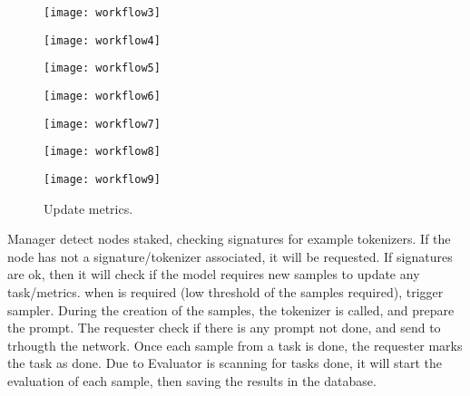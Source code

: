 \begin{figure}[H]
    \centering        
    \texttt{[image: workflow3]}
    \caption{}
    \label{secb:fig:wf3}
\end{figure}

\begin{figure}[H]
    \centering        
    \texttt{[image: workflow4]}
    \caption{}
    \label{secb:fig:wf4}
\end{figure}

\begin{figure}[H]
    \centering
    \texttt{[image: workflow5]}
    \caption{}
    \label{secb:fig:wf5}
\end{figure}

\begin{figure}[H]
    \centering
    \texttt{[image: workflow6]}
    \caption{}
    \label{secb:fig:wf6}
\end{figure}

\begin{figure}[H]
    \centering
    \texttt{[image: workflow7]}
    \caption{}
    \label{secb:fig:wf7}
\end{figure}

\begin{figure}[H]
    \centering
    \texttt{[image: workflow8]}
    \caption{}
    \label{secb:fig:wf8}
\end{figure}

\begin{figure}[htb!]
    \centering
    \texttt{[image: workflow9]}
    \caption{Update metrics.}
    \label{secb:fig:wf9}
\end{figure}

Manager detect nodes staked, checking signatures for example tokenizers. If the node has not a signature/tokenizer associated, it will be requested. 
If signatures are ok, then it will check if the model requires new samples to update any task/metrics. 
when is required (low threshold of the samples required), trigger sampler. 
During the creation of the samples, the tokenizer is called, and prepare the prompt. 
The requester check if there is any prompt not done, and send to trhougth the network. 
Once each sample from a task is done, the requester marks the task as done. 
Due to Evaluator is scanning for tasks done, it will start the evaluation of each sample, then saving the results in the database. 

